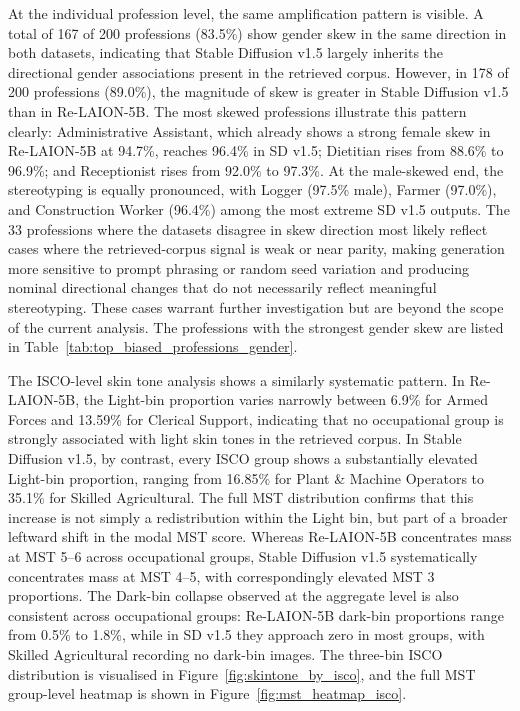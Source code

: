 At the individual profession level, the same amplification pattern is visible. A total of 167 of 200 professions (83.5\%) show gender skew in the same direction in both datasets, indicating that Stable Diffusion v1.5 largely inherits the directional gender associations present in the retrieved corpus. However, in 178 of 200 professions (89.0\%), the magnitude of skew is greater in Stable Diffusion v1.5 than in Re-LAION-5B. The most skewed professions illustrate this pattern clearly: Administrative Assistant, which already shows a strong female skew in Re-LAION-5B at 94.7\%, reaches 96.4\% in SD v1.5; Dietitian rises from 88.6\% to 96.9\%; and Receptionist rises from 92.0\% to 97.3\%. At the male-skewed end, the stereotyping is equally pronounced, with Logger (97.5\% male), Farmer (97.0\%), and Construction Worker (96.4\%) among the most extreme SD v1.5 outputs. The 33 professions where the datasets disagree in skew direction most likely reflect cases where the retrieved-corpus signal is weak or near parity, making generation more sensitive to prompt phrasing or random seed variation and producing nominal directional changes that do not necessarily reflect meaningful stereotyping. These cases warrant further investigation but are beyond the scope of the current analysis. The professions with the strongest gender skew are listed in Table~\ref{tab:top_biased_professions_gender}.

The ISCO-level skin tone analysis shows a similarly systematic pattern. In Re-LAION-5B, the Light-bin proportion varies narrowly between 6.9\% for Armed Forces and 13.59\% for Clerical Support, indicating that no occupational group is strongly associated with light skin tones in the retrieved corpus. In Stable Diffusion v1.5, by contrast, every ISCO group shows a substantially elevated Light-bin proportion, ranging from 16.85\% for Plant \& Machine Operators to 35.1\% for Skilled Agricultural. The full MST distribution confirms that this increase is not simply a redistribution within the Light bin, but part of a broader leftward shift in the modal MST score. Whereas Re-LAION-5B concentrates mass at MST 5--6 across occupational groups, Stable Diffusion v1.5 systematically concentrates mass at MST 4--5, with correspondingly elevated MST 3 proportions. The Dark-bin collapse observed at the aggregate level is also consistent across occupational groups: Re-LAION-5B dark-bin proportions range from 0.5\% to 1.8\%, while in SD v1.5 they approach zero in most groups, with Skilled Agricultural recording no dark-bin images. The three-bin ISCO distribution is visualised in Figure~\ref{fig:skintone_by_isco}, and the full MST group-level heatmap is shown in Figure~\ref{fig:mst_heatmap_isco}.

